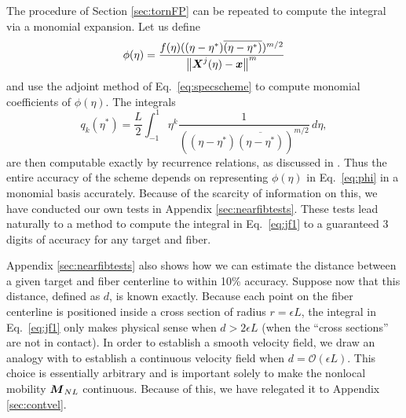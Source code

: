 The procedure of Section \ref{sec:tornFP} can be repeated to compute the integral via a monomial expansion. Let us define 
\begin{equation}
\label{eq:phi}
\phi(\eta)  = \frac{f(\eta)((\eta-\eta^*)\overline{(\eta-\eta^*)})^{m/2}}{\left\Vert \boldsymbol{X}^j(\eta) -\boldsymbol{x}\right\Vert^m}
\end{equation}
and use the adjoint method of Eq.\ \eqref{eq:specscheme} to compute monomial coefficients of $\phi(\eta)$. The integrals 
\begin{equation}
q_k(\eta^*) = \frac{L}{2}\int_{-1}^1 \eta^k \frac{1}{((\eta-\eta^*)\overline{(\eta-\eta^*)})^{m/2}}\, d\eta,
\end{equation}
are then computable exactly by recurrence relations, as discussed in \cite[Section~3.1]{barLud}. Thus the entire accuracy of the scheme depends on representing $\phi(\eta)$ in Eq.\ \eqref{eq:phi} in a monomial basis accurately. Because of the scarcity of information on this, we have conducted our own tests in Appendix \ref{sec:nearfibtests}. These tests lead naturally to a method to compute the integral in Eq.\ \eqref{eq:jf1} to a guaranteed 3 digits of accuracy for any target and fiber. 

Appendix \ref{sec:nearfibtests} also shows how we can estimate the distance between a given target and fiber centerline to within 10\% accuracy. Suppose now that this distance, defined as $d$, is known exactly. Because each point on the fiber centerline is positioned inside a cross section of radius $r=\epsilon L$, the integral in Eq.\ \eqref{eq:jf1} only makes physical sense when $d > 2\epsilon L$ (when the ``cross sections'' are not in contact). In order to establish a smooth velocity field, we draw an analogy with \cite{ts04} to establish a continuous velocity field when $d=\mathcal{O}(\epsilon L)$. This choice is essentially arbitrary and is important solely to make the nonlocal mobility $\boldsymbol{M}_{NL}$ continuous. Because of this, we have relegated it to Appendix \ref{sec:contvel}. 